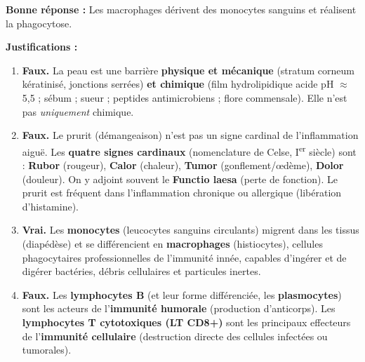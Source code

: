 \documentclass[11pt]{article}
\begin{document}
\begin{corrige}
\textbf{Bonne réponse :} \og Les macrophages dérivent des monocytes sanguins et réalisent la phagocytose. \fg

\textbf{Justifications :}
\begin{enumerate}
    \item \textbf{Faux.} La peau est une barrière \textbf{physique et mécanique} (stratum corneum kératinisé, jonctions serrées) \textbf{et chimique} (film hydrolipidique acide pH $\approx$ 5,5 ; sébum ; sueur ; peptides antimicrobiens ; flore commensale). Elle n'est pas \emph{uniquement} chimique.
    \item \textbf{Faux.} Le prurit (démangeaison) n'est pas un signe cardinal de l'inflammation aiguë. Les \textbf{quatre signes cardinaux} (nomenclature de Celse, I\textsuperscript{er} siècle) sont : \textbf{Rubor} (rougeur), \textbf{Calor} (chaleur), \textbf{Tumor} (gonflement/œdème), \textbf{Dolor} (douleur). On y adjoint souvent le \textbf{Functio laesa} (perte de fonction). Le prurit est fréquent dans l'inflammation chronique ou allergique (libération d'histamine).
    \item \textbf{Vrai.} Les \textbf{monocytes} (leucocytes sanguins circulants) migrent dans les tissus (diapédèse) et se différencient en \textbf{macrophages} (histiocytes), cellules phagocytaires professionnelles de l'immunité innée, capables d'ingérer et de digérer bactéries, débris cellulaires et particules inertes.
    \item \textbf{Faux.} Les \textbf{lymphocytes B} (et leur forme différenciée, les \textbf{plasmocytes}) sont les acteurs de l'\textbf{immunité humorale} (production d'anticorps). Les \textbf{lymphocytes T cytotoxiques (LT CD8+)} sont les principaux effecteurs de l'\textbf{immunité cellulaire} (destruction directe des cellules infectées ou tumorales).
\end{enumerate}
\end{corrige}
\end{document}
